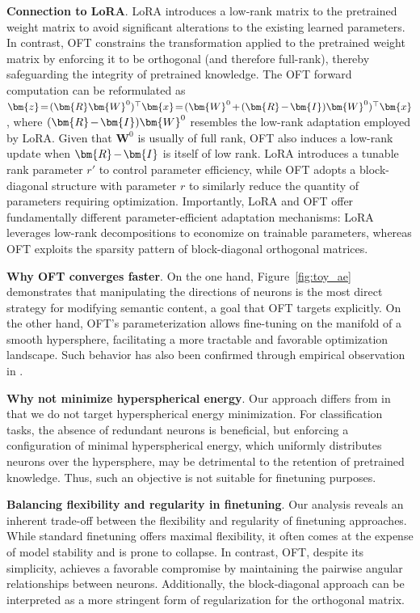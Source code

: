 \textbf{Connection to LoRA}. LoRA introduces a low-rank matrix to the pretrained weight matrix to avoid significant alterations to the existing learned parameters. In contrast, OFT constrains the transformation applied to the pretrained weight matrix by enforcing it to be orthogonal (and therefore full-rank), thereby safeguarding the integrity of pretrained knowledge. The OFT forward computation can be reformulated as $\thickmuskip=2mu \medmuskip=2mu \bm{z}=(\bm{R}\bm{W}^0)^\top\bm{x}=(\bm{W}^0+(\bm{R}-\bm{I})\bm{W}^0)^\top\bm{x}$, where $\thickmuskip=2mu \medmuskip=2mu (\bm{R}-\bm{I})\bm{W}^0$ resembles the low-rank adaptation employed by LoRA. Given that $\bm{W}^0$ is usually of full rank, OFT also induces a low-rank update when $\thickmuskip=2mu \medmuskip=2mu \bm{R}-\bm{I}$ is itself of low rank. LoRA introduces a tunable rank parameter $r'$ to control parameter efficiency, while OFT adopts a block-diagonal structure with parameter $r$ to similarly reduce the quantity of parameters requiring optimization. Importantly, LoRA and OFT offer fundamentally different parameter-efficient adaptation mechanisms: LoRA leverages low-rank decompositions to economize on trainable parameters, whereas OFT exploits the sparsity pattern of block-diagonal orthogonal matrices.

\textbf{Why OFT converges faster}. On the one hand, Figure~\ref{fig:toy_ae} demonstrates that manipulating the directions of neurons is the most direct strategy for modifying semantic content, a goal that OFT targets explicitly. On the other hand, OFT's parameterization allows fine-tuning on the manifold of a smooth hypersphere, facilitating a more tractable and favorable optimization landscape. Such behavior has also been confirmed through empirical observation in \cite{liu2021orthogonal}.

\textbf{Why not minimize hyperspherical energy}. Our approach differs from \cite{liu2021orthogonal} in that we do not target hyperspherical energy minimization. For classification tasks, the absence of redundant neurons is beneficial, but enforcing a configuration of minimal hyperspherical energy, which uniformly distributes neurons over the hypersphere, may be detrimental to the retention of pretrained knowledge. Thus, such an objective is not suitable for finetuning purposes.

\textbf{Balancing flexibility and regularity in finetuning}. Our analysis reveals an inherent trade-off between the flexibility and regularity of finetuning approaches. While standard finetuning offers maximal flexibility, it often comes at the expense of model stability and is prone to collapse. In contrast, OFT, despite its simplicity, achieves a favorable compromise by maintaining the pairwise angular relationships between neurons. Additionally, the block-diagonal approach can be interpreted as a more stringent form of regularization for the orthogonal matrix.

